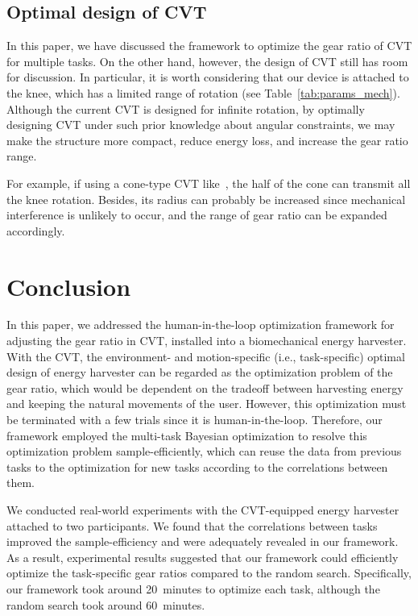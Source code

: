 \documentclass[twocolumn]{svjour3}          %
\begin{document}
\subsection{Optimal design of CVT}

In this paper, we have discussed the framework to optimize the gear ratio of CVT for multiple tasks.
On the other hand, however, the design of CVT still has room for discussion.
In particular, it is worth considering that our device is attached to the knee, which has a limited range of rotation (see Table~\ref{tab:params_mech}).
Although the current CVT is designed for infinite rotation, by optimally designing CVT under such prior knowledge about angular constraints, we may make the structure more compact, reduce energy loss, and increase the gear ratio range.

For example, if using a cone-type CVT like~\cite{singla2016optimization}, the half of the cone can transmit all the knee rotation.
Besides, its radius can probably be increased since mechanical interference is unlikely to occur, and the range of gear ratio can be expanded accordingly.

\section{Conclusion}
\label{sec:conclusion}

In this paper, we addressed the human-in-the-loop optimization framework for adjusting the gear ratio in CVT, installed into a biomechanical energy harvester.
With the CVT, the environment- and motion-specific (i.e., task-specific) optimal design of energy harvester can be regarded as the optimization problem of the gear ratio, which would be dependent on the tradeoff between harvesting energy and keeping the natural movements of the user.
However, this optimization must be terminated with a few trials since it is human-in-the-loop.
Therefore, our framework employed the multi-task Bayesian optimization to resolve this optimization problem sample-efficiently, which can reuse the data from previous tasks to the optimization for new tasks according to the correlations between them.

We conducted real-world experiments with the CVT-equipped energy harvester attached to two participants.
We found that the correlations between tasks improved the sample-efficiency and were adequately revealed in our framework.
As a result, experimental results suggested that our framework could efficiently optimize the task-specific gear ratios compared to the random search.
Specifically, our framework took around 20~minutes to optimize each task, although the random search took around 60~minutes.
\end{document}
